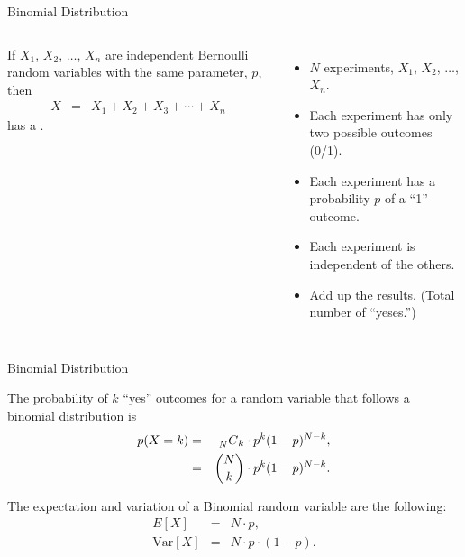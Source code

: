 \begin{frame}{Binomial Distribution}

  \begin{columns}
    \begin{definition}
      If $X_1$, $X_2$, $\ldots$, $X_n$ are independent Bernoulli
      random variables with the same parameter, $p$, then
      \begin{eqnarray*}
        X & = & X_1 + X_2 + X_3 + \cdots + X_n
      \end{eqnarray*}
      has a .
    \end{definition}
    \begin{itemize}
    \item $N$ experiments, $X_1$, $X_2$, $\ldots$, $X_n$.
    \item Each experiment has only two possible outcomes (0/1).
    \item Each experiment has a probability $p$ of a ``1'' outcome.
    \item Each experiment is independent of the others.
    \item Add up the results. (Total number of ``yeses.'')
    \end{itemize}
  \end{columns}
\end{frame}


\begin{frame}{Binomial Distribution}

  \vfill
  
    The probability of $k$ ``yes'' outcomes for a random variable that
    follows a binomial distribution is
    \begin{eqnarray*}
      p(X=k) & = & \prescript{~}{N}{C}_k \cdot p^k (1-p)^{N-k}, \\
      & = & {N \choose k} \cdot p^k (1-p)^{N-k}.
    \end{eqnarray*}

    \vfill

    The expectation and variation of a Binomial random variable are
    the following:
    \begin{eqnarray*}
      E[X] & = & N\cdot p, \\
      \mathrm{Var}[X] & = & N \cdot p \cdot (1-p).
    \end{eqnarray*}

\end{frame}



